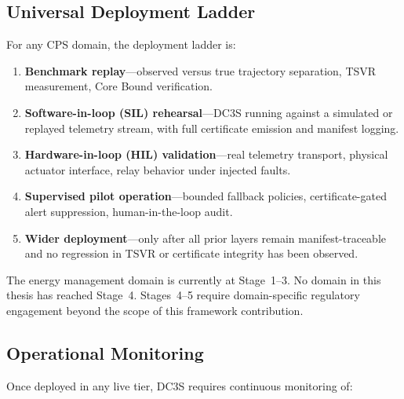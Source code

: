 \subsection{Universal Deployment Ladder}

For any CPS domain, the deployment ladder is:

\begin{enumerate}
  \item \textbf{Benchmark replay}---observed versus true trajectory separation,
    TSVR measurement, Core Bound verification.
  \item \textbf{Software-in-loop (SIL) rehearsal}---DC3S running against a
    simulated or replayed telemetry stream, with full certificate emission
    and manifest logging.
  \item \textbf{Hardware-in-loop (HIL) validation}---real telemetry transport,
    physical actuator interface, relay behavior under injected faults.
  \item \textbf{Supervised pilot operation}---bounded fallback policies,
    certificate-gated alert suppression, human-in-the-loop audit.
  \item \textbf{Wider deployment}---only after all prior layers remain
    manifest-traceable and no regression in TSVR or certificate integrity
    has been observed.
\end{enumerate}

The energy management domain is currently at Stage~1--3.  No domain in
this thesis has reached Stage~4.  Stages~4--5 require domain-specific
regulatory engagement beyond the scope of this framework contribution.

\subsection{Operational Monitoring}

Once deployed in any live tier, DC3S requires continuous monitoring of:

